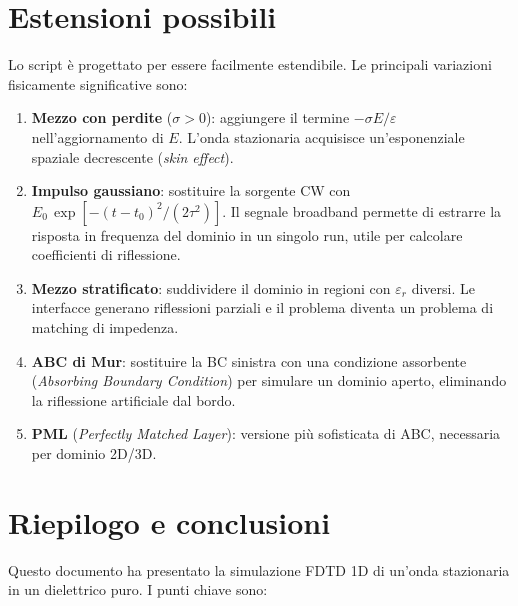 \documentclass[a4paper, 11pt]{article}
\newcommand{\eps}{\varepsilon}
\begin{document}
\section{Estensioni possibili}

Lo script è progettato per essere facilmente estendibile. Le principali
variazioni fisicamente significative sono:

\begin{enumerate}
    \item \textbf{Mezzo con perdite} ($\sigma > 0$): aggiungere il termine
          $-\sigma E / \eps$ nell'aggiornamento di $E$. L'onda stazionaria
          acquisisce un'esponenziale spaziale decrescente (\emph{skin effect}).

    \item \textbf{Impulso gaussiano}: sostituire la sorgente CW con
          $E_0\,\exp[-(t-t_0)^2/(2\tau^2)]$. Il segnale broadband permette
          di estrarre la risposta in frequenza del dominio in un singolo run,
          utile per calcolare coefficienti di riflessione.

    \item \textbf{Mezzo stratificato}: suddividere il dominio in regioni
          con $\eps_r$ diversi. Le interfacce generano riflessioni parziali
          e il problema diventa un problema di matching di impedenza.

    \item \textbf{ABC di Mur}: sostituire la BC sinistra con una condizione
          assorbente (\emph{Absorbing Boundary Condition}) per simulare un
          dominio aperto, eliminando la riflessione artificiale dal bordo.

    \item \textbf{PML} (\emph{Perfectly Matched Layer}): versione più
          sofisticata di ABC, necessaria per dominio 2D/3D.
\end{enumerate}

\section{Riepilogo e conclusioni}

Questo documento ha presentato la simulazione FDTD 1D di un'onda stazionaria
in un dielettrico puro. I punti chiave sono:
\end{document}
